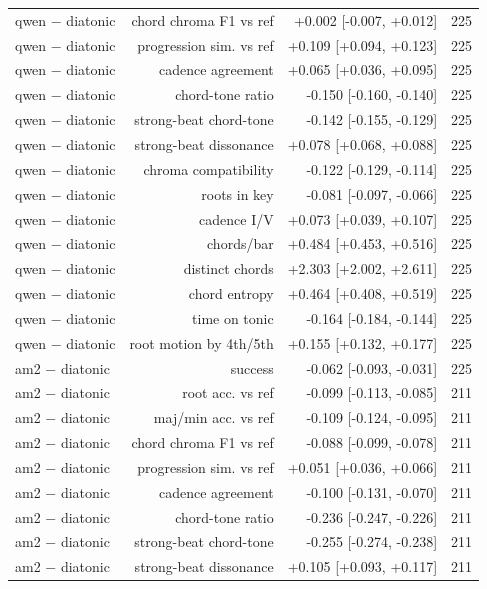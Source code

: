 \begin{table}[t]
\begin{tabular}{lrrr}
qwen $-$ diatonic & chord chroma F1 vs ref & +0.002 [-0.007, +0.012] & 225 \\
qwen $-$ diatonic & progression sim. vs ref & +0.109 [+0.094, +0.123] & 225 \\
qwen $-$ diatonic & cadence agreement & +0.065 [+0.036, +0.095] & 225 \\
qwen $-$ diatonic & chord-tone ratio & -0.150 [-0.160, -0.140] & 225 \\
qwen $-$ diatonic & strong-beat chord-tone & -0.142 [-0.155, -0.129] & 225 \\
qwen $-$ diatonic & strong-beat dissonance & +0.078 [+0.068, +0.088] & 225 \\
qwen $-$ diatonic & chroma compatibility & -0.122 [-0.129, -0.114] & 225 \\
qwen $-$ diatonic & roots in key & -0.081 [-0.097, -0.066] & 225 \\
qwen $-$ diatonic & cadence I/V & +0.073 [+0.039, +0.107] & 225 \\
qwen $-$ diatonic & chords/bar & +0.484 [+0.453, +0.516] & 225 \\
qwen $-$ diatonic & distinct chords & +2.303 [+2.002, +2.611] & 225 \\
qwen $-$ diatonic & chord entropy & +0.464 [+0.408, +0.519] & 225 \\
qwen $-$ diatonic & time on tonic & -0.164 [-0.184, -0.144] & 225 \\
qwen $-$ diatonic & root motion by 4th/5th & +0.155 [+0.132, +0.177] & 225 \\
am2 $-$ diatonic & success & -0.062 [-0.093, -0.031] & 225 \\
am2 $-$ diatonic & root acc. vs ref & -0.099 [-0.113, -0.085] & 211 \\
am2 $-$ diatonic & maj/min acc. vs ref & -0.109 [-0.124, -0.095] & 211 \\
am2 $-$ diatonic & chord chroma F1 vs ref & -0.088 [-0.099, -0.078] & 211 \\
am2 $-$ diatonic & progression sim. vs ref & +0.051 [+0.036, +0.066] & 211 \\
am2 $-$ diatonic & cadence agreement & -0.100 [-0.131, -0.070] & 211 \\
am2 $-$ diatonic & chord-tone ratio & -0.236 [-0.247, -0.226] & 211 \\
am2 $-$ diatonic & strong-beat chord-tone & -0.255 [-0.274, -0.238] & 211 \\
am2 $-$ diatonic & strong-beat dissonance & +0.105 [+0.093, +0.117] & 211 \\

\end{tabular}
\end{table}

